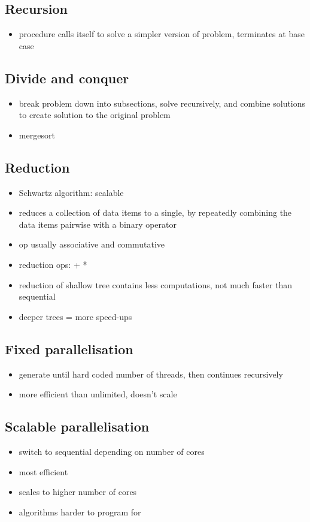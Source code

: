\documentclass[10pt, multicolumn, a4paper]{article}
\begin{document}
\begin{multicols}{2}
	\subsection*{Recursion}
	\begin{itemize}
	\item procedure calls itself to solve a simpler version of problem, terminates at base case
	\end{itemize}
	\subsection*{Divide and conquer}
	\begin{itemize}
	\item break problem down into subsections, solve recursively, and combine solutions to create solution to the original problem
	\item mergesort
	\end{itemize}
	\subsection*{Reduction}
	\begin{itemize}
	\item Schwartz algorithm: scalable
	\item reduces a collection of data items to a single, by repeatedly combining the data items pairwise with a binary operator
	\item op usually associative and commutative
	\item reduction ops: + *
	\item reduction of shallow tree contains less computations, not much faster than sequential
	\item deeper trees = more speed-ups
	\end{itemize}	

	\subsection*{Fixed parallelisation}
	\begin{itemize}
	\item generate until hard coded number of threads, then continues recursively
	\item more efficient than unlimited, doesn't scale
	\end{itemize}
	\subsection*{Scalable parallelisation}
	\begin{itemize}
	\item switch to sequential depending on number of cores 
	\item most efficient
	\item scales to higher number of cores
	\item algorithms harder to program for
	\end{itemize}	

\end{multicols}
\end{document}
